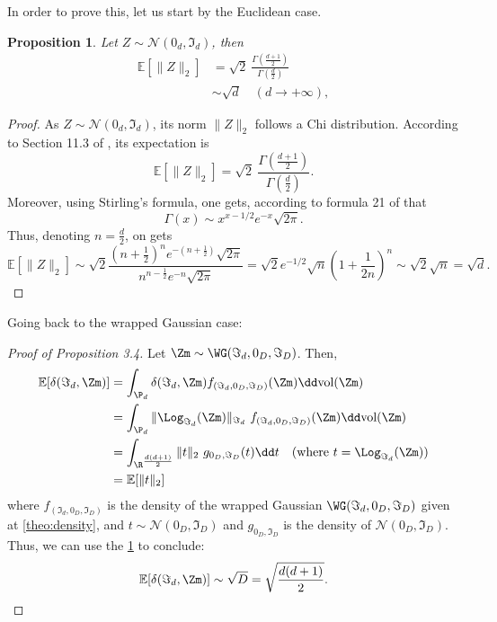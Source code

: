 \documentclass[10pt]{article} %
\theoremstyle{plain}
\newtheorem{proposition}[theorem]{Proposition}
\theoremstyle{definition}
\theoremstyle{remark}
\begin{document}
In order to prove this, let us start by the Euclidean case.
\begin{proposition}
  \label{prop:spread_gaussian}
  Let $Z \sim \mathcal{N}(0_d, \Im_d)$, then
  \begin{equation*}
    \begin{aligned}
      \mathbb{E}[\|Z\|_2] &= \sqrt{2}~\frac{\Gamma\left(\frac{d+1}{2}\right)}{\Gamma\left(\frac{d}{2}\right)} \\
      &\sim \sqrt{d} \quad (d \rightarrow +\infty),
    \end{aligned}
  \end{equation*}
\end{proposition}
\begin{proof}
  As $Z \sim \mathcal{N}(0_d, \Im_d)$, its norm $\|Z\|_2$ follows a Chi distribution. According to Section 11.3 of \citet{Evans2001StatisticalDT}, its expectation is
  $$\mathbb{E}[\|Z\|_2] =  \sqrt{2}~\frac{\Gamma\left(\frac{d+1}{2}\right)}{\Gamma\left(\frac{d}{2}\right)}.$$
  Moreover, using Stirling's formula, one gets, according to formula 21 of \cite{euler} that
  $$\Gamma(x) \sim x^{x-1/2}e^{-x}\sqrt{2\pi}.$$
  Thus, denoting $n = \frac{d}{2}$, on gets
  $$\mathbb{E}[\|Z\|_2] \sim \sqrt{2}\frac{(n+\frac{1}{2})^{n}e^{-(n+\frac{1}{2})}\sqrt{2\pi}}{n^{n - \frac{1}{2}} e^{-n}\sqrt{2\pi}} = \sqrt{2}e^{-1/2} \sqrt{n}(1+\frac{1}{2n})^n \sim \sqrt{2}\sqrt{n} = \sqrt{d}.$$
\end{proof}
Going back to the wrapped Gaussian case:
\begin{proof}[Proof of Proposition 3.4]
  Let $\Zm \sim \WG(\Im_d, 0_D, \Im_D)$.
  Then,
  \begin{equation*}
    \begin{aligned}
      \mathbb{E}[\delta(\Im_d, \Zm)] &= \int_{\P_d} \delta(\Im_d, \Zm) f_{(\Im_d, 0_D, \Im_D)}(\Zm)\dd\text{vol}(\Zm) \\
      &= \int_{\P_d} \|\Log_{\Im_d}(\Zm)\|_{\Im_d} ~f_{(\Im_d, 0_D, \Im_D)}(\Zm)\dd\text{vol}(\Zm) \\
      &= \int_{\R^{\frac{d(d+1)}{2}}} \|t\|_2 ~g_{0_D, \Im_D}(t) \dd t \quad (\text{where } t = \Log_{\Im_d}(\Zm))\\
      &= \mathbb{E}[\|t\|_2]
    \end{aligned}
  \end{equation*}
  where $f_{(\Im_d, 0_D, \Im_D)}$ is the density of the wrapped Gaussian $\WG(\Im_d, 0_D, \Im_D)$ given at \cref{theo:density}, and $t \sim \mathcal{N}(0_D, \Im_D)$ and $g_{0_D, \Im_D}$ is the density of $\mathcal{N}(0_D, \Im_D)$. Thus, we can use the \cref{prop:spread_gaussian} to conclude:
  $$\mathbb{E}[\delta(\Im_d, \Zm)] \sim \sqrt{D} = \sqrt{\frac{d(d+1)}{2}}.$$
\end{proof}
\label{appendix:spread}
\end{document}
